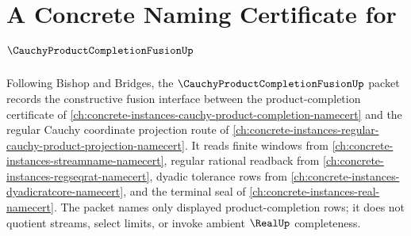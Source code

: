 \chapter{A Concrete Naming Certificate for $\CauchyProductCompletionFusionUp$}
\label{ch:concrete-instances-cauchy-product-completion-fusion-namecert}

Following Bishop and Bridges, the $\CauchyProductCompletionFusionUp$ packet
records the constructive fusion interface between the product-completion
certificate of \autoref{ch:concrete-instances-cauchy-product-completion-namecert}
and the regular Cauchy coordinate projection route of
\autoref{ch:concrete-instances-regular-cauchy-product-projection-namecert}. It
reads finite windows from \autoref{ch:concrete-instances-streamname-namecert},
regular rational readback from \autoref{ch:concrete-instances-regseqrat-namecert},
dyadic tolerance rows from \autoref{ch:concrete-instances-dyadicratcore-namecert},
and the terminal seal of \autoref{ch:concrete-instances-real-namecert}. The
packet names only displayed product-completion rows; it does not quotient
streams, select limits, or invoke ambient $\RealUp$ completeness.

